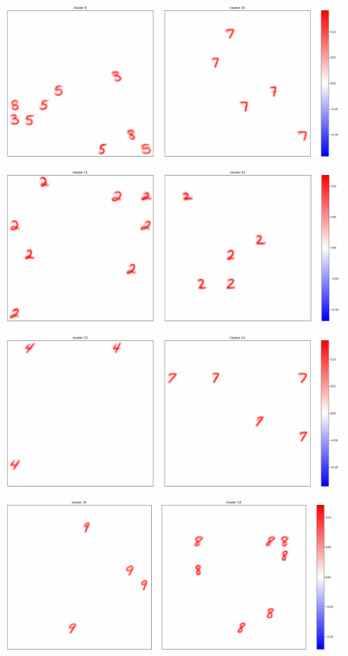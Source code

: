 \documentclass[a4paper]{report}
\begin{document}
\begin{figure} [H]
    \centering
    \includegraphics [width=\textwidth ] {c/h/9.png}
    \caption{}
\end{figure}

\begin{figure} [H]
    \centering
    \includegraphics [width=\textwidth ] {c/h/11.png}
    \caption{}
\end{figure}

\begin{figure} [H]
    \centering
    \includegraphics [width=\textwidth ] {c/h/13.png}
    \caption{}
\end{figure}

\begin{figure} [H]
    \centering
    \includegraphics [width=\textwidth ] {c/h/15.png}
    \caption{}
\end{figure}
\end{document}

